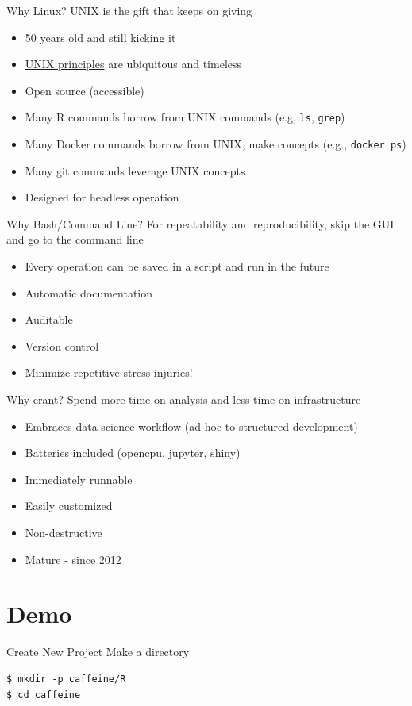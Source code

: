 \documentclass{beamer}
\begin{document}
\begin{frame}{Why Linux?}
UNIX is the gift that keeps on giving
\begin{itemize}
\item 50 years old and still kicking it
\item \href{}{UNIX principles} are ubiquitous and timeless
\item Open source (accessible)
\item Many R commands borrow from UNIX commands (e.g, \lstinline|ls|, \lstinline|grep|)
\item Many Docker commands borrow from UNIX, make concepts (e.g., \lstinline|docker ps|)
\item Many git commands leverage UNIX concepts
\item Designed for headless operation
\end{itemize}
\end{frame}


\begin{frame}{Why Bash/Command Line?}
For repeatability and reproducibility, skip the GUI and go to the command line
\begin{itemize}
\item Every operation can be saved in a script and run in the future
\item Automatic documentation
\item Auditable
\item Version control
\item Minimize repetitive stress injuries!
\end{itemize}
\end{frame}


\begin{frame}{Why crant?}
Spend more time on analysis and less time on infrastructure

\begin{itemize}
\item Embraces data science workflow (ad hoc to structured development)
\item Batteries included (opencpu, jupyter, shiny)
\item Immediately runnable
\item Easily customized
\item Non-destructive
\item Mature - since 2012
\end{itemize}
\end{frame}



\section{Demo}
\begin{frame}[fragile]{Create New Project}
Make a directory

\begin{lstlisting}
$ mkdir -p caffeine/R
$ cd caffeine
\end{lstlisting}
\end{frame}
\end{document}
